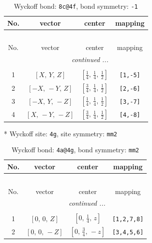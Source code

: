 \documentclass[fleqn,8pt]{jsarticle}
\begin{document}
\begin{longtable}{cccc}
\caption{Wyckoff bond: {\tt 8c@4f}, bond symmetry: {\tt -1}}
 \\
 \hline \hline
No. & vector & center & mapping \\ \hline \endfirsthead

\multicolumn{3}{l}{\tablename\ \thetable{}} \\
 \hline \hline
No. & vector & center & mapping \\ \hline \endhead

 \hline \hline
\multicolumn{3}{r}{\footnotesize\it continued ...} \\ \endfoot

 \hline \hline
\multicolumn{3}{r}{} \\ \endlastfoot

1 & $\left[ X,\, Y,\, Z \right]$ & $\left[ \frac{1}{4},\, \frac{1}{4},\, \frac{1}{2} \right]$ & {\tt [1,-5]} \\ \hline
2 & $\left[ - X,\, - Y,\, Z \right]$ & $\left[ \frac{3}{4},\, \frac{1}{4},\, \frac{1}{2} \right]$ & {\tt [2,-6]} \\ \hline
3 & $\left[ - X,\, Y,\, - Z \right]$ & $\left[ \frac{1}{4},\, \frac{1}{4},\, \frac{1}{2} \right]$ & {\tt [3,-7]} \\ \hline
4 & $\left[ X,\, - Y,\, - Z \right]$ & $\left[ \frac{3}{4},\, \frac{1}{4},\, \frac{1}{2} \right]$ & {\tt [4,-8]} \\
\end{longtable}
* Wyckoff site: {\tt 4g}, site symmetry: {\tt mm2}
\renewcommand{\arraystretch}{1.2}
\begin{longtable}{cccc}
\caption{Wyckoff bond: {\tt 4a@4g}, bond symmetry: {\tt mm2}}
 \\
 \hline \hline
No. & vector & center & mapping \\ \hline \endfirsthead

\multicolumn{3}{l}{\tablename\ \thetable{}} \\
 \hline \hline
No. & vector & center & mapping \\ \hline \endhead

 \hline \hline
\multicolumn{3}{r}{\footnotesize\it continued ...} \\ \endfoot

 \hline \hline
\multicolumn{3}{r}{} \\ \endlastfoot

1 & $\left[ 0,\, 0,\, Z \right]$ & $\left[ 0,\, \frac{1}{4},\, z \right]$ & {\tt [1,2,7,8]} \\ \hline
2 & $\left[ 0,\, 0,\, - Z \right]$ & $\left[ 0,\, \frac{3}{4},\, - z \right]$ & {\tt [3,4,5,6]} \\
\end{longtable}
\end{document}
